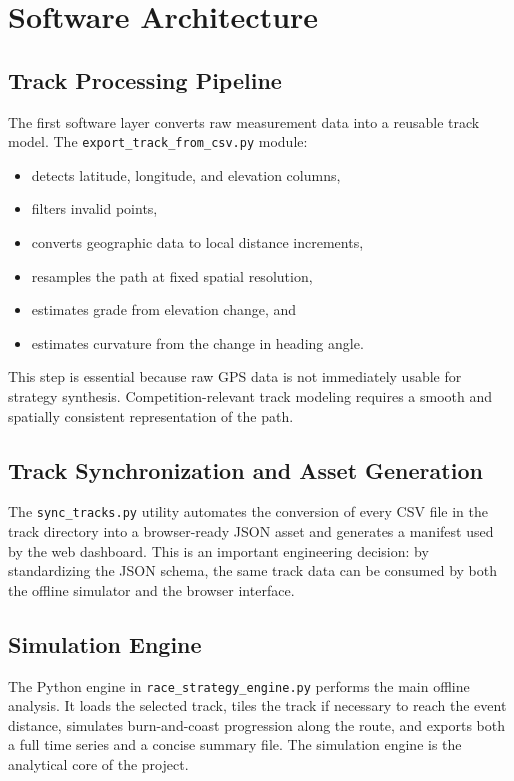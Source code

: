 \documentclass[11pt]{article}
\begin{document}
\section{Software Architecture}

\subsection{Track Processing Pipeline}

The first software layer converts raw measurement data into a reusable track model. The \texttt{export\_track\_from\_csv.py} module:

\begin{itemize}[leftmargin=1.5em]
\item detects latitude, longitude, and elevation columns,
\item filters invalid points,
\item converts geographic data to local distance increments,
\item resamples the path at fixed spatial resolution,
\item estimates grade from elevation change, and
\item estimates curvature from the change in heading angle.
\end{itemize}

This step is essential because raw GPS data is not immediately usable for strategy synthesis. Competition-relevant track modeling requires a smooth and spatially consistent representation of the path.

\subsection{Track Synchronization and Asset Generation}

The \texttt{sync\_tracks.py} utility automates the conversion of every CSV file in the track directory into a browser-ready JSON asset and generates a manifest used by the web dashboard. This is an important engineering decision: by standardizing the JSON schema, the same track data can be consumed by both the offline simulator and the browser interface.

\subsection{Simulation Engine}

The Python engine in \texttt{race\_strategy\_engine.py} performs the main offline analysis. It loads the selected track, tiles the track if necessary to reach the event distance, simulates burn-and-coast progression along the route, and exports both a full time series and a concise summary file. The simulation engine is the analytical core of the project.
\end{document}
